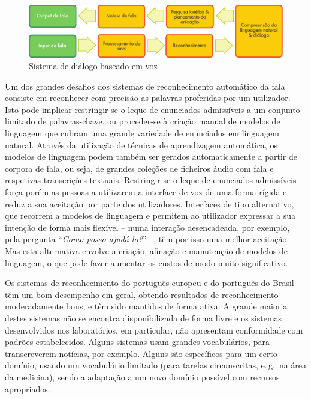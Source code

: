 \begin{multicols}{2}
\begin{figure}[htb]
  \center 
  \includegraphics[width=\textwidth]{../_media/portuguese/simple_speech-based_dialogue_architecture}
  \caption{Sistema de diálogo baseado em voz}
  \label{fig:dialoguearch_de}
\end{figure}


Um dos grandes desafios dos sistemas de re\-co\-nhe\-ci\-men\-to automático da fala consiste em 
reconhecer com precisão as palavras proferidas por um utilizador. 
Isto pode implicar restringir-se o leque de enunciados admissíveis a um conjunto limitado de palavras-chave, 
ou proceder-se à criação manual de modelos de linguagem que cubram uma grande variedade de enunciados em linguagem natural. 
Através da utilização de técnicas de aprendizagem automática, os modelos de linguagem podem também
ser gerados automaticamente a partir de corpora de fala, ou seja, de grandes coleções de ficheiros
áudio com fala e respetivas transcrições textuais.
Restringir-se o leque de enunciados admissíveis força porém as pessoas a utilizarem a interface de voz
de uma forma rígida e reduz a sua aceitação por parte dos utilizadores. 
Interfaces de tipo alternativo, que recorrem a modelos de linguagem e permitem ao utilizador expressar a sua intenção
de forma mais flexível -- numa interação desencadeada, por exemplo, pela pergunta “\textit{Como posso ajudá-lo?}” --, têm por isso uma melhor aceitação. Mas esta alternativa envolve a criação, 
afinação e manutenção de modelos de linguagem, o que pode fazer aumentar os custos de modo muito significativo. 

Os sistemas de reconhecimento do português europeu e do português do Brasil têm um bom desempenho em geral, 
obtendo resultados de reconhecimento moderadamente bons, e têm sido mantidos de forma ativa.
A grande maioria destes sistemas não se encontra disponibilizada de forma livre e os sistemas
desenvolvidos nos laboratórios, em particular, não apresentam conformidade com padrões estabelecidos. 
Alguns sistemas usam grandes vocabulários, para transcreverem notícias, por exemplo. 
Alguns são específicos para um certo domínio, usando um vocabulário limitado 
(para tarefas circunscritas, e.\,g.~na área da medicina), sendo a adaptação a um novo domínio 
possível com recursos apropriados.


\end{multicols}
